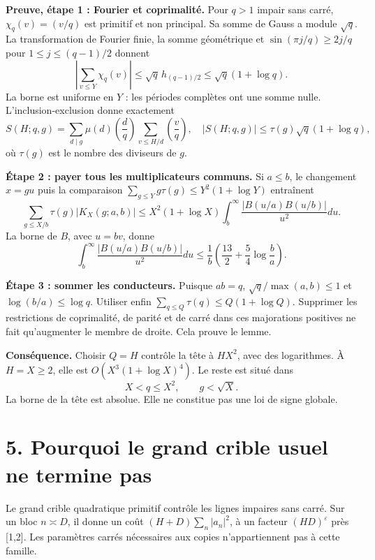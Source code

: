 \documentclass[
  11pt,
  a4paper,
]{article}
\begin{document}
\textbf{Preuve, étape 1 : Fourier et coprimalité.} Pour \(q>1\) impair
sans carré, \(\chi_q(v)=(v/q)\) est primitif et non principal. Sa somme
de Gauss a module \(\sqrt q\). La transformation de Fourier finie, la
somme géométrique et \(\sin(\pi j/q)\ge2j/q\) pour \(1\le j\le(q-1)/2\)
donnent \[
\left|\sum_{v\le Y}\chi_q(v)\right|
\le\sqrt q\,h_{(q-1)/2}\le\sqrt q(1+\log q).
\] La borne est uniforme en \(Y\) : les périodes complètes ont une somme
nulle. L'inclusion-exclusion donne exactement \[
S(H;q,g)=\sum_{d\mid g}\mu(d)\left(\frac dq\right)
\sum_{v\le H/d}\left(\frac vq\right),
\quad |S(H;q,g)|\le\tau(g)\sqrt q(1+\log q),
\] où \(\tau(g)\) est le nombre des diviseurs de \(g\).

\textbf{Étape 2 : payer tous les multiplicateurs communs.} Si
\(a\le b\), le changement \(x=gu\) puis la comparaison
\(\sum_{g\le Y}g\tau(g)\le Y^2(1+\log Y)\) entraînent \[
\sum_{g\le X/b}\tau(g)|K_X(g;a,b)|
\le X^2(1+\log X)\int_b^\infty
\frac{|B(u/a)B(u/b)|}{u^2}du.
\] La borne de \(B\), avec \(u=bv\), donne \[
\int_b^\infty\frac{|B(u/a)B(u/b)|}{u^2}du
\le\frac1b\left(\frac{13}{2}+\frac54\log\frac ba\right).
\]

\textbf{Étape 3 : sommer les conducteurs.} Puisque \(ab=q\),
\(\sqrt q/\max(a,b)\le1\) et \(\log(b/a)\le\log q\). Utiliser enfin
\(\sum_{q\le Q}\tau(q)\le Q(1+\log Q)\). Supprimer les restrictions de
coprimalité, de parité et de carré dans ces majorations positives ne
fait qu'augmenter le membre de droite. Cela prouve le lemme.

\textbf{Conséquence.} Choisir \(Q=H\) contrôle la tête à \(HX^2\), avec
des logarithmes. À \(H=X\ge2\), elle est \(O(X^3(1+\log X)^4)\). Le
reste est situé dans \[
\boxed{X<q\le X^2,\qquad g<\sqrt X.}
\] La borne de la tête est absolue. Elle ne constitue pas une loi de
signe globale.

\newpage

\hypertarget{pourquoi-le-grand-crible-usuel-ne-termine-pas}{%
\section{5. Pourquoi le grand crible usuel ne termine
pas}\label{pourquoi-le-grand-crible-usuel-ne-termine-pas}}

Le grand crible quadratique primitif contrôle les lignes impaires sans
carré. Sur un bloc \(n\asymp D\), il donne un coût
\((H+D)\sum_n|a_n|^2\), à un facteur \((HD)^\varepsilon\) près
{[}1,2{]}. Les paramètres carrés nécessaires aux copies n'appartiennent
pas à cette famille.
\end{document}
